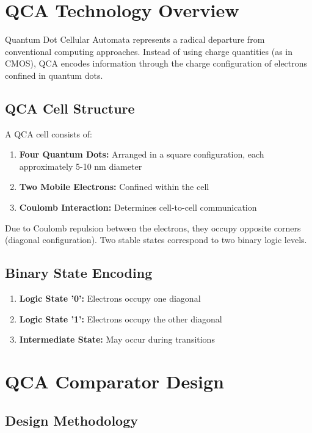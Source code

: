 \documentclass[12pt,a4paper,twoside]{report}
\begin{document}
\section{QCA Technology Overview}

Quantum Dot Cellular Automata represents a radical departure from conventional computing approaches. Instead of using charge quantities (as in CMOS), QCA encodes information through the charge configuration of electrons confined in quantum dots.

\subsection{QCA Cell Structure}

A QCA cell consists of:

\begin{enumerate}
    \item \textbf{Four Quantum Dots:} Arranged in a square configuration, each approximately 5-10 nm diameter
    \item \textbf{Two Mobile Electrons:} Confined within the cell
    \item \textbf{Coulomb Interaction:} Determines cell-to-cell communication
\end{enumerate}

Due to Coulomb repulsion between the electrons, they occupy opposite corners (diagonal configuration). Two stable states correspond to two binary logic levels.

\subsection{Binary State Encoding}

\begin{enumerate}
    \item \textbf{Logic State '0':} Electrons occupy one diagonal
    \item \textbf{Logic State '1':} Electrons occupy the other diagonal
    \item \textbf{Intermediate State:} May occur during transitions
\end{enumerate}

\section{QCA Comparator Design}

\subsection{Design Methodology}
\end{document}
